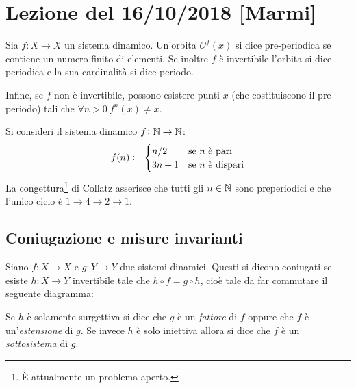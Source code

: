 \section{Lezione del 16/10/2018 [Marmi]}
\begin{definition} Sia $f\colon X \to X$ un sistema dinamico. Un'orbita $\mathcal{O}^f(x)$ si dice pre-periodica se contiene un numero finito di elementi. Se inoltre $ f $ è invertibile l'orbita si dice periodica e la sua cardinalità si dice periodo.

Infine, se $f$ non è invertibile, possono esistere punti $ x $ (che costituiscono il pre-periodo) tali che $ \forall n > 0\ f^n (x) \neq x $.
\end{definition}

\begin{example}
Si consideri il sistema dinamico $f \colon \mathbb{N} \to \mathbb{N}$:
\[
    f(n) \coloneqq
    \begin{cases}
        n/2  & \text{se $ n $ è pari}    \\
        3n+1 & \text{se $ n $ è dispari}
    \end{cases}
\]
La congettura\footnote{È attualmente un problema aperto.} di Collatz asserisce che tutti gli $n \in \mathbb{N}$ sono preperiodici e che l'unico ciclo è $ 1 \to 4 \to 2 \to 1 $.
\end{example}

\subsection{Coniugazione e misure invarianti}
\begin{definition}
Siano $f\colon X \to X$ e $g\colon Y \to Y$ due sistemi dinamici. Questi si dicono coniugati se esiste $h \colon X \to Y$ invertibile tale che $h \circ f = g \circ h$, cioè tale da far commutare il seguente diagramma:
\begin{center}
\end{center}
Se $h$ è solamente surgettiva si dice che $g$ è un \emph{fattore} di $f$ oppure che $f$ è un'\emph{estensione} di $g$. Se invece $h$ è solo iniettiva allora si dice che $f$ è un \emph{sottosistema} di $g$.
\end{definition}

